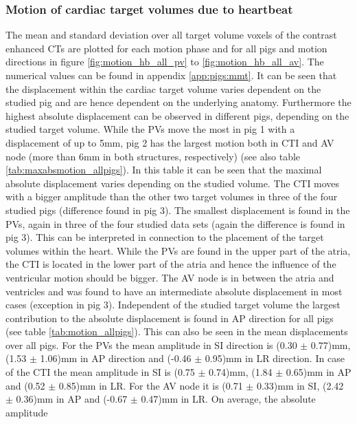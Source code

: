 \documentclass[type=dr, dr=rernat, accentcolor=tud7b,colorbacktitle, bigchapter, openright, twoside, 12pt ]{tudthesis}
\begin{document}


\subsubsection*{Motion of cardiac target volumes due to heartbeat}
\label{Sec:Motion_pigs}


The mean and standard deviation over all target volume voxels of the contrast enhanced CTs are plotted for each motion phase and for all pigs 
and motion directions in figure \ref{fig:motion_hb_all_pv} to \ref{fig:motion_hb_all_av}. The numerical values can be found 
in appendix \ref{app:pigs:mmt}. It can be seen that the displacement within the cardiac target volume varies dependent on the studied pig and 
are hence dependent on the underlying anatomy. Furthermore the highest absolute displacement can be observed in different pigs, depending on 
the studied target volume. While the PVs move the most in pig 1 with a displacement of up to 5mm, pig 2 has the 
largest motion both in CTI and AV node (more than 6mm in both structures, respectively) (see also table \ref{tab:maxabsmotion_allpigs}). 
In this table it can be seen that the maximal absolute displacement varies depending on the studied volume. The  
CTI moves with a bigger amplitude than the other two target volumes in three of the four studied pigs (difference found in pig 3). 
The smallest displacement is found in the PVs, again in three of the four studied data sets (again the difference is found in pig 3). 
This can be interpreted in connection to the placement of the target volumes within the heart. While the PVs are found in the upper part of the 
atria, the CTI is located in the lower part of the atria and hence the influence of the ventricular motion should be bigger. The AV node is in between 
the atria and ventricles and was found to have an intermediate absolute displacement in most cases (exception in pig 3).
Independent of the studied target volume the largest contribution to the absolute displacement is found in AP direction for all pigs 
(see table \ref{tab:motion_allpigs}). This can also be seen in the mean displacements over all pigs. 
For the PVs the mean amplitude in SI direction is (0.30 $\pm$ 0.77)mm, (1.53 $\pm$ 1.06)mm in AP direction and (-0.46 $\pm$ 0.95)mm in LR 
direction. In case of the CTI the mean amplitude in SI is (0.75 $\pm$ 0.74)mm, (1.84 $\pm$ 0.65)mm in AP and (0.52 $\pm$ 0.85)mm in LR. For 
the AV node it is (0.71 $\pm$ 0.33)mm in SI, (2.42 $\pm$ 0.36)mm in AP and (-0.67  $\pm$ 0.47)mm in LR. On average, the absolute amplitude 
\end{document}
